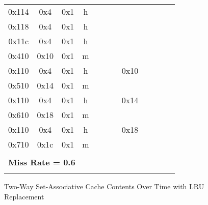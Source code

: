 \documentclass[10pt]{article}
\begin{document}
\begin{figure}[H]
{\begin{tabular}{@{\extracolsep{3pt}}cccccccccccc@{}}
0x114 & 0x4 & 0x1 & h &     &     &     &     &     &     &     &     \\
0x118 & 0x4 & 0x1 & h &     &     &     &     &     &     &     &     \\
0x11c & 0x4 & 0x1 & h &     &     &     &     &     &     &     &     \\
0x410 & 0x10& 0x1 & m &     &     &     &     &     &     &     &     \\
0x110 & 0x4 & 0x1 & h &     &     &     & 0x10&     &     &     &     \\
0x510 & 0x14& 0x1 & m &     &     &     &     &     &     &     &     \\
0x110 & 0x4 & 0x1 & h &     &     &     & 0x14&     &     &     &     \\
0x610 & 0x18& 0x1 & m &     &     &     &     &     &     &     &     \\
0x110 & 0x4 & 0x1 & h &     &     &     & 0x18&     &     &     &     \\
0x710 & 0x1c& 0x1 & m &     &     &     &     &     &     &     &     \\
\Xhline{2\arrayrulewidth}
\multicolumn{12}{l}{\textbf{Number of Misses = 12}} \\
\hline
\multicolumn{12}{l}{\textbf{Miss Rate = 0.6}} \\
\Xhline{2\arrayrulewidth}
\end{tabular}
}
\caption{Two-Way Set-Associative Cache Contents Over Time with LRU Replacement}
\end{figure}
\end{document}
